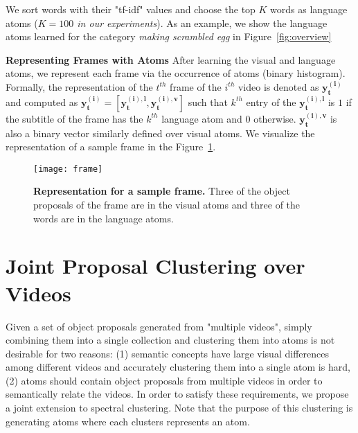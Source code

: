 We sort words with their "tf-idf" values and choose the top $K$ words as language atoms (\emph{$K=100$ in our experiments}). As an example, we show the language atoms learned for the category \emph{making scrambled egg} in Figure~\ref{fig:overview} %


\noindent\textbf{Representing Frames with Atoms}
After learning the visual and language atoms, we represent each frame via the occurrence of atoms (binary histogram). Formally, the representation of the $t^{th}$ frame of the $i^{th}$ video is denoted as $\mathbf{y^{(i)}_t}$ and computed as $\mathbf{y^{(i)}_t}=[\mathbf{y^{(i),l}_t},\mathbf{y^{(i),v}_t}]$ such that $k^{th}$ entry of the $\mathbf{y^{(i),l}_t}$ is $1$ if the subtitle of the frame has the $k^{th}$ language atom and $0$ otherwise. $\mathbf{y^{(i),v}_t}$ is also a binary vector similarly defined over visual atoms. We visualize the representation of a sample frame in the Figure~\ref{visFrame}.
\begin{figure}[h!]
  \texttt{[image: frame]}
  \caption{\textbf{Representation for a sample frame.} Three of the object proposals of the frame are in the visual atoms and three of the words are in the language atoms.}
  \label{visFrame}
  \vspace{-3mm}
\end{figure}

\section{Joint Proposal Clustering over Videos}
\label{jointProp}
Given a set of object proposals generated from "multiple videos", simply combining them into a single collection and clustering them into atoms is not desirable for two reasons: (1) semantic concepts have large visual differences among different videos and accurately clustering them into a single atom is hard, (2) atoms should contain object proposals from multiple videos in order to semantically relate the videos. In order to satisfy these requirements, we propose a joint extension to spectral clustering. Note that the purpose of this clustering is generating atoms where each clusters represents an atom.

